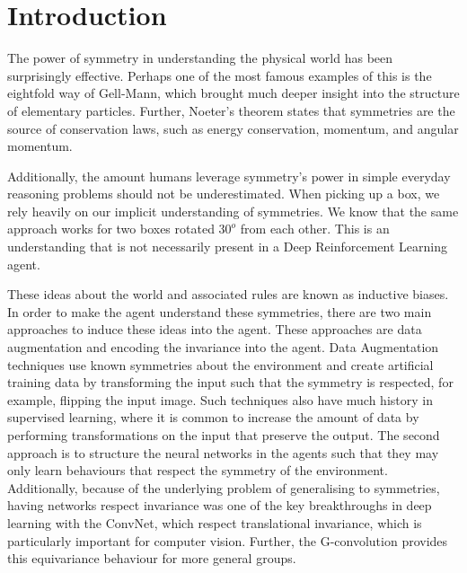 \chapter{Introduction}\label{Chap1}
The power of symmetry in understanding the physical world has been surprisingly effective. Perhaps one of the most famous examples of this is the eightfold way of Gell-Mann\cite{gellmann1961eight}, which brought much deeper insight into the structure of elementary particles. Further, Noeter's theorem states that symmetries are the source of conservation laws, such as energy conservation, momentum, and angular momentum.

Additionally, the amount humans leverage symmetry's power in simple everyday reasoning problems should not be underestimated. When picking up a box, we rely heavily on our implicit understanding of symmetries. We know that the same approach works for two boxes rotated $30^o$ from each other. This is an understanding that is not necessarily present in a Deep Reinforcement Learning agent.

These ideas about the world and associated rules are known as inductive biases. In order to make the agent understand these symmetries, there are two main approaches to induce these ideas into the agent. These approaches are data augmentation and encoding the invariance into the agent. Data Augmentation techniques use known symmetries about the environment and create artificial training data by transforming the input such that the symmetry is respected, for example, flipping the input image\cite{laskin2020reinforcement, yijion2020invariant}. Such techniques also have much history in supervised learning, where it is common to increase the amount of data by performing transformations on the input that preserve the output.
The second approach is to structure the neural networks in the agents such that they may only learn behaviours that respect the symmetry of the environment\cite{vanderpol2020mdp,wang2022so2, mondal2020group}. Additionally, because of the underlying problem of generalising to symmetries, having networks respect invariance was one of the key breakthroughs in deep learning with the ConvNet\cite{lecun1989backprop}, which respect translational invariance, which is particularly important for computer vision. Further, the G-convolution\cite{cohen2016group} provides this equivariance behaviour for more general groups.


